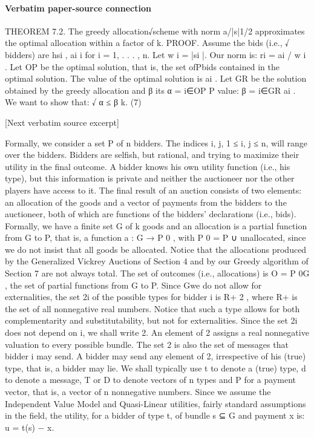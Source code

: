 \documentclass[10pt]{article}
\begin{document}
\paragraph{Verbatim paper-source connection}
\begin{ReviewVerbatim}
THEOREM 7.2. The greedy allocation√scheme with norm a/|s|1/2 approximates
the optimal allocation within a factor of k.
PROOF. Assume the bids (i.e.,
√ bidders) are hsi , ai i for i = 1, . . . , n. Let
w i = |si |. Our norm is: ri = ai / w i . Let OP be the optimal solution, that is, the
set ofPbids contained in the optimal solution. The value of the optimal solution is
ai . Let GR be the solution obtained by the greedy allocation and β its
α = i∈OP P
value: β = i∈GR ai . We want to show that:
√
α ≤ β k.
(7)

[Next verbatim source excerpt]

Formally, we consider a set P of n bidders. The indices i, j, 1 ≤ i, j ≤ n, will
range over the bidders. Bidders are selfish, but rational, and trying to maximize their
utility in the final outcome. A bidder knows his own utility function (i.e., his type),
but this information is private and neither the auctioneer nor the other players have
access to it. The final result of an auction consists of two elements: an allocation
of the goods and a vector of payments from the bidders to the auctioneer, both of
which are functions of the bidders’ declarations (i.e., bids). Formally, we have a
finite set G of k goods and an allocation is a partial function from G to P, that is, a
function a : G → P 0 , with P 0 = P ∪ {unallocated}, since we do not insist that all
goods be allocated. Notice that the allocations produced by the Generalized Vickrey
Auctions of Section 4 and by our Greedy algorithm of Section 7 are not always
total. The set of outcomes (i.e., allocations) is O = P 0G , the set of partial functions
from G to P. Since Gwe do not allow for externalities, the set 2i of the possible types
for bidder i is R+ 2 , where R+ is the set of all nonnegative real numbers. Notice
that such a type allows for both complementarity and substitutability, but not for
externalities. Since the set 2i does not depend on i, we shall write 2. An element
of 2 assigns a real nonnegative valuation to every possible bundle. The set 2 is
also the set of messages that bidder i may send. A bidder may send any element of
2, irrespective of his (true) type, that is, a bidder may lie. We shall typically use t
to denote a (true) type, d to denote a message, T or D to denote vectors of n types
and P for a payment vector, that is, a vector of n nonnegative numbers.
Since we assume the Independent Value Model and Quasi-Linear utilities, fairly
standard assumptions in the field, the utility, for a bidder of type t, of bundle s ⊆ G
and payment x is:
u = t(s) − x.


\end{ReviewVerbatim}
\end{document}
